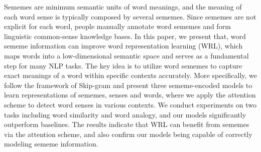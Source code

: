 Sememes are minimum semantic units of word meanings, and the meaning of each word sense is typically composed by several sememes. Since sememes are not explicit for each word, people manually annotate word sememes and form linguistic common-sense knowledge bases. In this paper, we present that, word sememe information can improve word representation learning (WRL), which maps words into a low-dimensional semantic space and serves as a fundamental step for many NLP tasks. The key idea is to utilize word sememes to capture exact meanings of a word within specific contexts accurately. More specifically, we follow the framework of Skip-gram and present three sememe-encoded models to learn representations of sememes, senses and words, where we apply the attention scheme to detect word senses in various contexts. We conduct experiments on two tasks including word similarity and word analogy, and our models significantly outperform baselines. The results indicate that WRL can benefit from sememes via the attention scheme, and also confirm our models being capable of correctly modeling sememe information.
